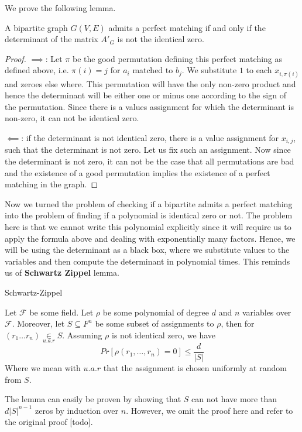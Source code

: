 	We prove the following lemma.
	\begin{lemma}
		A bipartite graph $G(V, E)$ admits a perfect matching if and only if the determinant of the matrix $A'_G$ is not the identical zero.
	\end{lemma}
	\begin{proof}
		$\implies$: Let $\pi$ be the good permutation defining this perfect matching as defined above, i.e. $\pi(i) = j$ for $a_i$ matched to $b_j$. We substitute $1$ to each $x_{i, \pi(i)}$ and zeroes else where. This permutation will have the only non-zero product and hence the determinant will be either one or minus one according to the sign of the permutation. Since there is a values assignment for which the determinant is non-zero, it can not be identical zero.

		$\impliedby$: if the determinant is not identical zero, there is a value assignment for $x_{i, j}$, such that the determinant is not zero. Let us fix such an assignment. Now since the determinant is not zero, it can not be the case that all permutations are bad and the existence of a good permutation implies the existence of a perfect matching in the graph. 
	\end{proof}

	Now we turned the problem of checking if a bipartite admits a perfect matching into the problem of finding if a polynomial is identical zero or not. The problem here is that we cannot write this polynomial explicitly since it will require us to apply the formula above and dealing with exponentially many factors. Hence, we will be using the determinant as a black box, where we substitute values to the variables and then compute the determinant in polynomial times. This reminds us of \textbf{Schwartz Zippel} lemma.


	\begin{lemma}
		Schwartz-Zippel

		Let $\mathcal{F}$ be some field. Let $\rho$ be some polynomial of degree $d$ and $n$ variables over $\mathcal{F}$. Moreover, let $S \subseteq F^{n}$ be some subset of assignments to $\rho$, then for $(r_1 \dots r_n) \underset{u.a.r}{\in}S$. Assuming $\rho$ is not identical zero, we have
		$$Pr\left[\rho(r_1, \dots, r_n) = 0\right] \leq \frac{d}{|S|}$$
		Where we mean with $u.a.r$ that the assignment is chosen uniformly at random from $S$.
	\end{lemma}
	The lemma can easily be proven by showing that $S$ can not have more than $d |S|^{n-1}$ zeros by induction over $n$. However, we omit the proof here and refer to the original proof [todo].

